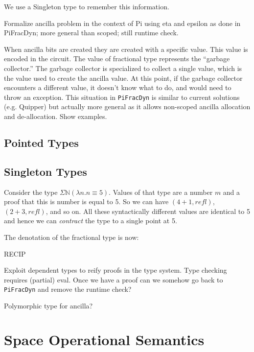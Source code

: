 \documentclass[sigplan,10pt,review,anonymous]{acmart}
\begin{document}
 

We use a Singleton type
to remember this information. 






Formalize ancilla problem in the context of Pi using eta and epsilon
as done in PiFracDyn; more general than scoped; still runtime
check.

When ancilla bits are created they are created with a specific
value. This value is encoded in the circuit. The value of fractional
type represents the ``garbage collector.''  The garbage collector is
specialized to collect a single value, which is the value used to
create the ancilla value. At this point, if the garbage collector
encounters a different value, it doesn't know what to do, and would
need to throw an exception. This situation in \verb|PiFracDyn| is
similar to current solutions (e.g. Quipper) but actually more general
as it allows non-scoped ancilla allocation and de-allocation. Show
examples.



\subsection{Pointed Types}
 
\subsection{Singleton Types}
 
Consider the type $\Sigma \mathbb{N} (\lambda n. n \equiv 5)$. Values
of that type are a number $m$ and a proof that this is number is equal
to 5. So we can have $(4 + 1, \textit{refl})$, $(2 + 3 ,
\textit{refl})$, and so on. All these syntactically different values
are identical to 5 and hence we can \emph{contract} the type to a
single point at 5. 

The denotation of the fractional type is now:

RECIP 

Exploit dependent types to reify proofs in the type system. Type
checking requires (partial) eval. Once we have a proof can we somehow
go back to \verb|PiFracDyn| and remove the runtime check?

Polymorphic type for ancilla?

\section{Space Operational Semantics}
  
\end{document}

